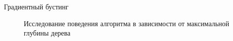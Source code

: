 \documentclass[12pt]{article}
\begin{document}
\begin{section}{Градиентный бустинг}
\begin{figure}[h!]
\begin{minipage}[h]{0.5\linewidth}
\end{minipage}
\hfill
\begin{minipage}[h]{0.5\linewidth}
\end{minipage}
\caption{Исследование поведения алгоритма в зависимости от максимальной глубины дерева}
\label{ris:image1}
\end{figure}


\end{section}
\end{document}
